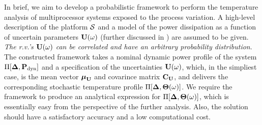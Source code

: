 In brief, we aim to develop a probabilistic framework to perform the temperature analysis of multiprocessor systems exposed to the process variation. A high-level description of the platform $\mathcal{S}$ and a model of the power dissipation as a function of uncertain parameters $\vU(\o)$ (further discussed in ) are assumed to be given. \emph{The r.v.'s $\vU(\o)$ can be correlated and have an arbitrary probability distribution}. The constructed framework takes a nominal dynamic power profile of the system $\prof{\mP_\dyn}$ and a specification of the uncertainties $\vU(\o)$, which, in the simpliest case, is the mean vector $\vExp_\mrv{\vU}$ and covarince matrix $\mCov_\mrv{\vU}$, and delivers the corresponding stochastic temperature profile $\Pi[\boldsymbol{\Delta}, {\boldsymbol\Theta}(\omega)]$. We require the framework to produce an analytical expression for $\Pi[\boldsymbol{\Delta}, {\boldsymbol\Theta}(\omega)]$, which is essentially easy from the perspective of the further analysis. Also, the solution should have a satisfactory accuracy and a low computational cost.

